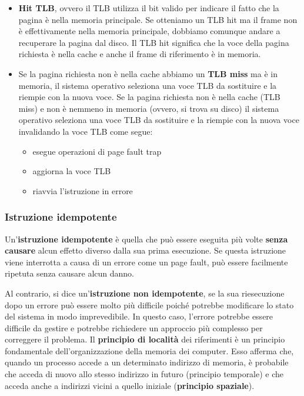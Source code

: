 \documentclass{article}
\begin{document}
\begin{itemize}
    \item \textbf{Hit TLB}, ovvero il TLB utilizza il bit valido per indicare il fatto che la pagina è nella memoria principale. Se otteniamo un TLB hit ma il frame non è effettivamente nella memoria principale, dobbiamo comunque andare a recuperare la pagina dal disco. Il TLB hit significa che la voce della pagina richiesta è nella cache e anche il frame di riferimento è in memoria.
    \item Se la pagina richiesta non è nella cache abbiamo un \textbf{TLB miss} ma è in memoria, il sistema operativo seleziona una voce TLB da sostituire e la riempie con la nuova voce. Se la pagina richiesta non è nella cache (TLB miss) e non è nemmeno in memoria (ovvero, si trova su disco) il sistema operativo seleziona una voce TLB da sostituire e la riempie con la nuova voce invalidando la voce TLB come segue:
    \begin{itemize}
        \item esegue operazioni di page fault trap
        \item aggiorna la voce TLB
        \item riavvia l'istruzione in errore
    \end{itemize}
\end{itemize}

\subsubsection{Istruzione idempotente}
Un'\textbf{istruzione idempotente} è quella che può essere eseguita più volte \textbf{senza causare} alcun effetto diverso dalla sua prima esecuzione. Se questa istruzione viene interrotta a causa di un errore come un page fault, può essere facilmente ripetuta senza causare alcun danno.\par
Al contrario, si dice un'\textbf{istruzione non idempotente}, se la sua riesecuzione dopo un errore può essere molto più difficile poiché potrebbe modificare lo stato del sistema in modo imprevedibile. In questo caso, l'errore potrebbe essere difficile da gestire e potrebbe richiedere un approccio più complesso per correggere il problema.
Il \textbf{principio di località} dei riferimenti è un principio fondamentale dell'organizzazione della memoria dei computer. Esso afferma che, quando un processo accede a un determinato indirizzo di memoria, è probabile che acceda di nuovo allo stesso indirizzo in futuro (principio temporale) e che acceda anche a indirizzi vicini a quello iniziale (\textbf{principio spaziale}).
\end{document}
